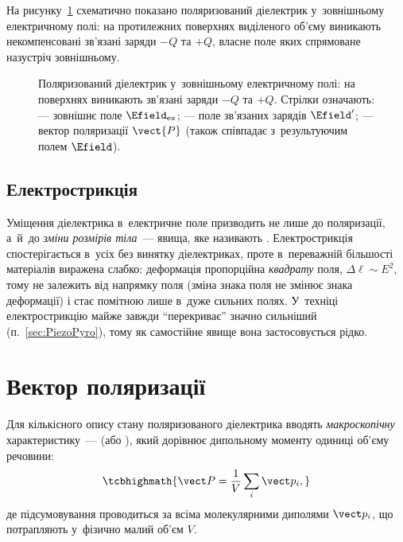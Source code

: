 На рисунку~\ref{pic:PolarizedDielectric} схематично показано поляризований діелектрик
у~зовнішньому електричному полі: на протилежних поверхнях виділеного об'єму виникають
некомпенсовані зв'язані заряди $-Q$ та $+Q$, власне поле яких спрямоване назустріч
зовнішньому.

\begin{figure}[h!]
	\centering
	\caption{Поляризований діелектрик у~зовнішньому електричному полі: на поверхнях
		виникають зв'язані заряди $-Q$ та $+Q$. Стрілки означають:
		\protect{} --- зовнішнє поле $\Efield_\text{ex}$;
		\protect{} --- поле зв'язаних зарядів $\Efield'$;
		\protect{} ---
		вектор поляризації $\vect{P}$ (також співпадає з~результуючим полем $\Efield$). }
	\label{pic:PolarizedDielectric}
\end{figure}


\subsection*{Електрострикція}


Уміщення діелектрика в~електричне поле призводить не лише до поляризації, а~й~до
\emph{зміни розмірів тіла}~--- явища, яке називають .
Електрострикція спостерігається в~усіх без винятку діелектриках, проте в~переважній
більшості матеріалів виражена слабко: деформація пропорційна \emph{квадрату} поля,
$\Delta \ell \sim E^2$, тому не залежить від напрямку поля (зміна знака поля не змінює
знака деформації) і стає помітною лише в~дуже сильних полях. У~техніці електрострикцію
майже завжди \enquote{перекриває} значно сильніший 
(п.~\ref{sec:PiezoPyro}), тому як самостійне явище вона застосовується рідко.


\section{Вектор поляризації}\hypertarget{polarization-vector}{}


Для кількісного опису стану поляризованого діелектрика вводять \emph{макроскопічну}
характеристику~---  (або ), який дорівнює
дипольному моменту одиниці об'єму речовини:
\begin{equation}\label{eq:Pdef}
	\tcbhighmath{
		\vect P = \frac1V \sum_i \vect p_i,
	}
\end{equation}
де підсумовування проводиться за всіма молекулярними диполями $\vect p_i$, що потрапляють
у~фізично малий об'єм $V$.

